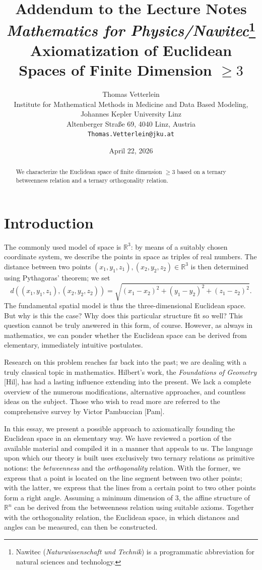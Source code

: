 \documentclass[11pt,a4paper]{article}
\title{Addendum to the Lecture Notes \textit{Mathematics for Physics/Nawitec}\footnote{Nawitec (\textit{Naturwissenschaft und Technik}) is a programmatic abbreviation for natural sciences and technology.}\\
\vspace{0.5cm}
\textbf{Axiomatization of Euclidean Spaces of Finite Dimension $\ge 3$}}
\author{Thomas Vetterlein\\
\small Institute for Mathematical Methods in Medicine and Data Based Modeling,\\
\small Johannes Kepler University Linz\\
\small Altenberger Stra{\ss}e 69, 4040 Linz, Austria\\
\small \texttt{Thomas.Vetterlein@jku.at}}
\date{April 22, 2026}
\begin{document}
\maketitle

\begin{abstract}
\noindent We characterize the Euclidean space of finite dimension $\ge 3$ based on a ternary betweenness relation and a ternary orthogonality relation.
\end{abstract}

\section{Introduction}

The commonly used model of space is $\mathbb{R}^3$: by means of a suitably chosen coordinate system, we describe the points in space as triples of real numbers. The distance between two points $(x_1, y_1, z_1), (x_2, y_2, z_2) \in \mathbb{R}^3$ is then determined using Pythagoras' theorem; we set
\[ d((x_1, y_1, z_1), (x_2, y_2, z_2)) = \sqrt{(x_1 - x_2)^2 + (y_1 - y_2)^2 + (z_1 - z_2)^2}. \]
The fundamental spatial model is thus the three-dimensional Euclidean space. But why is this the case? Why does this particular structure fit so well? This question cannot be truly answered in this form, of course. However, as always in mathematics, we can ponder whether the Euclidean space can be derived from elementary, immediately intuitive postulates.

Research on this problem reaches far back into the past; we are dealing with a truly classical topic in mathematics. Hilbert's work, the \textit{Foundations of Geometry} [Hil], has had a lasting influence extending into the present. We lack a complete overview of the numerous modifications, alternative approaches, and countless ideas on the subject. Those who wish to read more are referred to the comprehensive survey by Victor Pambuccian [Pam].

In this essay, we present a possible approach to axiomatically founding the Euclidean space in an elementary way. We have reviewed a portion of the available material and compiled it in a manner that appeals to us. The language upon which our theory is built uses exclusively two ternary relations as primitive notions: the \textit{betweenness} and the \textit{orthogonality} relation. With the former, we express that a point is located on the line segment between two other points; with the latter, we express that the lines from a certain point to two other points form a right angle. Assuming a minimum dimension of 3, the affine structure of $\mathbb{R}^n$ can be derived from the betweenness relation using suitable axioms. Together with the orthogonality relation, the Euclidean space, in which distances and angles can be measured, can then be constructed.
\end{document}
